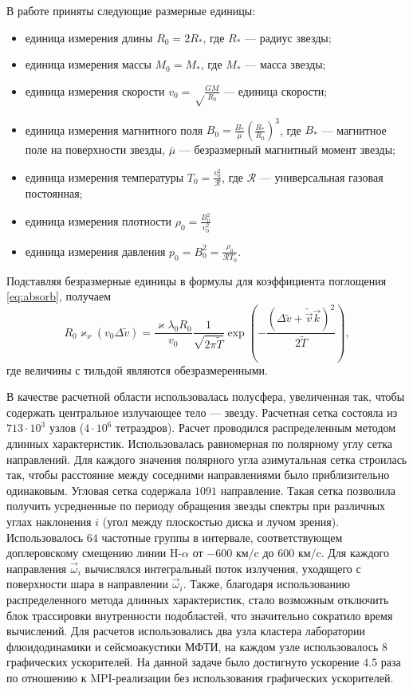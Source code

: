 В работе \cite{romanova2009} приняты следующие размерные единицы: 
\begin{itemize}
\item единица измерения длины $R_0 = 2 R_*$, где $R_*$ --- радиус звезды;
\item единица измерения массы $M_0 = M_*$, где $M_*$ --- масса звезды;
\item единица измерения скорости $v_0 = \sqrt\frac{GM}{R_0}$ --- единица скорости;
\item единица измерения магнитного поля $B_0 = \frac{B_*}{\bar \mu} \left(\frac{R_*}{R_0}\right)^3$, где $B_*$ --- магнитное поле на поверхности звезды, $\bar \mu$ --- безразмерный магнитный момент звезды;
\item единица измерения температуры $T_0 = \frac{v_0^2}{\mathcal R}$, где $\mathcal R$ --- универсальная газовая постоянная;
\item единица измерения плотности $\rho_0 = \frac{B_0^2}{v_0^2}$
\item единица измерения давления $p_0 = B_0^2 = \frac{\rho_0}{\mathcal{R} T_0}$.
\end{itemize}

Подставляя безразмерные единицы в формулы для коэффициента поглощения \eqref{eq:absorb}, получаем 
\[
R_0 \varkappa_\nu(v_0 \Delta \tilde v) = \frac{\varkappa \lambda_0 R_0}{v_0} \frac{1}{\sqrt{2\pi \tilde T}} \exp\left(
-\frac{(\Delta  \tilde v + \tilde {\vec v} \vec k)^2}{2\tilde T}
\right),
\]
где величины с тильдой являются обезразмеренными.

В качестве расчетной области использовалась полусфера, увеличенная так, чтобы содержать центральное излучающее тело --- звезду. Расчетная сетка состояла из $713 \cdot 10^3$ узлов ($4 \cdot 10^6$ тетраэдров). Расчет проводился распределенным методом длинных характеристик.
Использовалась равномерная по полярному углу сетка направлений. Для каждого значения полярного угла
азимутальная сетка строилась так, чтобы расстояние между соседними направлениями было приблизительно одинаковым. Угловая сетка содержала $1091$ направление. Такая сетка позволила получить усредненные по периоду обращения звезды спектры при различных углах наклонения $i$ (угол между плоскостью диска и лучом зрения). Использовалось $64$ частотные группы в интервале, соответствующем доплеровскому смещению линии H-$\alpha$ от $-600 \text{ км}/\text{c}$ до $600 \text{ км}/\text{c}$. Для каждого направления $\vec \omega_i$ вычислялся интегральный поток излучения, уходящего с поверхности шара в направлении $\vec \omega_i$. Также, благодаря использованию распределенного метода длинных характеристик, стало возможным отключить блок трассировки внутренности подобластей, что значительно сократило время вычислений. Для расчетов использовались два узла кластера лаборатории флюидодинамики и сейсмоакустики МФТИ, на каждом узле использовалось 8 графических ускорителей. На данной задаче было достигнуто ускорение $4.5$ раза по отношению к MPI-реализации без использования графических ускорителей.

